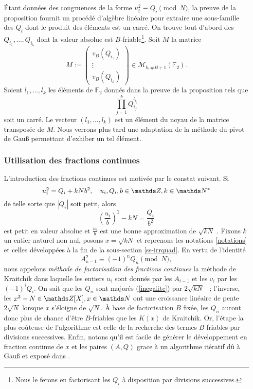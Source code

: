 Étant données des congruences de la forme $u_i^2 \equiv Q_i \pmod{N}$, la
preuve de la proposition fournit un procédé d'algèbre linéaire pour extraire
une sous-famille des $Q_i$ dont le produit des éléments est un carré. On trouve
tout d'abord des $Q_{i_1}, \dots, Q_{i_k}$ dont la valeur absolue est
$B$-friable\footnote{Nous le ferons en factorisant les $Q_i$ à disposition par
divisions successives.}. Soit $M$ la matrice \[M := \begin{pmatrix}
v_B(Q_{i_1}) \\ \vdots \\ v_B(Q_{i_k})\end{pmatrix}\in \mathcal{M}_{k,
\#B+1}(\mathbb{F}_2).\] Soient $l_{1}, \dots, l_{k}$ les éléments de
$\mathbb{F}_2$ donnés dans la preuve de la proposition tels que \[\prod_{j=1}^k
Q_{i_j}^{l_{i_j}}\] soit un carré. Le vecteur $(l_1, \dots, l_{k})$ est un
élément du noyau de la matrice transposée de $M$. Nous verrons plus tard une
adaptation de la méthode du pivot de Gau\ss{} permettant d'exhiber un tel
élément.

\subsubsection{Utilisation des fractions continues}

L'introduction des fractions continues est motivée par le constat suivant. Si
\[u_i^2 = Q_i + kNb^2, \quad u_i, Q_i, b\in \Z, k\in \N^*\] de telle sorte que
$| Q_i |$ soit petit, alors \[\left(\frac{u_i}{b}\right)^2 - kN =
\frac{Q_i}{b^2}\] est petit en valeur absolue et $\frac{u_i}{b}$ est une bonne
approximation de $\sqrt{kN}$ . Fixons $k$ un entier naturel non nul,
posons $x = \sqrt{kN}$ et reprenons les notations \ref{notations} et celles
développées à la fin de la sous-section \ref{ss-irrquad}. En vertu de
l'identité \[A_{n-1}^2 \equiv (-1)^n Q_n \pmod{N},\] nous appelons
\emph{méthode de factorisation des fractions continues} la méthode de Kraitchik
dans laquelle les entiers $u_i$ sont donnés par les $A_{i-1}$ et les $v_i$ par
les $(-1)^i Q_i$. On sait que les $Q_n$ sont majorés (\ref{inegalite}) par $2
\sqrt{kN}$ ~; l'inverse, les $x^2 - N\in \Z[X], x\in \N$ ont une croissance
linéaire de pente $2\sqrt{N}$ lorsque $x$ s'éloigne de $\sqrt{N}$. À base de
factorisation $B$ fixée, les $Q_n$ auront donc plus de chance d'être
$B$-friables que les $K(x)$ de Kraitchik. Or, l'étape la plus coûteuse de
l'algorithme est celle de la recherche des termes $B$-friables par divisions
successives. Enfin, notons qu'il est facile de générer le développement en
fraction continue de $x$ et les paires $(A, Q)$ grace à un algorithme itératif
dû à Gau\ss{} et exposé dans . \\

